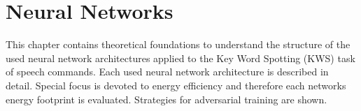 
\chapter{Neural Networks}\label{sec:nn}
This chapter contains theoretical foundations to understand the structure of the used neural network architectures applied to the Key Word Spotting (KWS) task of speech commands.
Each used neural network architecture is described in detail.
Special focus is devoted to energy efficiency and therefore each networks energy footprint is evaluated.
Strategies for adversarial training are shown.





